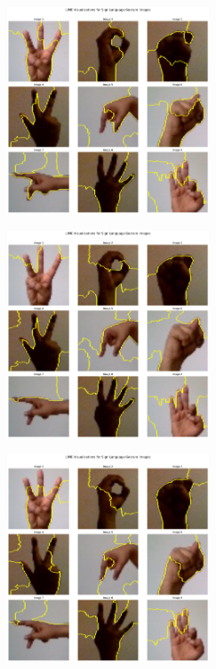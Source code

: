 \begin{multicols}{2}
\includegraphics[width=0.45\textwidth]{Assets/lime_visualization/EfficientNetB0.png}

\vspace{0.8cm}

\includegraphics[width=0.45\textwidth]{Assets/lime_visualization/EfficientNetV2L.png}

\vspace{0.8cm}

\newpage

\includegraphics[width=0.45\textwidth]{Assets/lime_visualization/MOBILENETV2.png}

\vspace{0.8cm}


\end{multicols}
